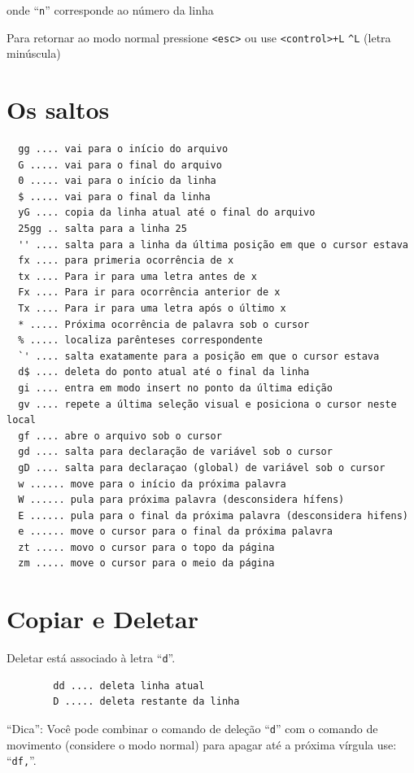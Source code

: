 \documentclass[10pt,a4paper,openany]{book}
\begin{document}
onde ``\verb|n|'' corresponde ao número da linha

Para retornar ao modo normal pressione \verb|<esc>| ou use \verb|<control>+L| \verb|^L| (letra
minúscula)

\section{Os saltos}\label{Os saltos}

\begin{verbatim}
  gg .... vai para o início do arquivo
  G ..... vai para o final do arquivo
  0 ..... vai para o início da linha
  $ ..... vai para o final da linha
  yG .... copia da linha atual até o final do arquivo
  25gg .. salta para a linha 25
  '' .... salta para a linha da última posição em que o cursor estava
  fx .... para primeria ocorrência de x
  tx .... Para ir para uma letra antes de x
  Fx .... Para ir para ocorrência anterior de x
  Tx .... Para ir para uma letra após o último x
  * ..... Próxima ocorrência de palavra sob o cursor
  % ..... localiza parênteses correspondente
  `' .... salta exatamente para a posição em que o cursor estava
  d$ .... deleta do ponto atual até o final da linha
  gi .... entra em modo insert no ponto da última edição
  gv .... repete a última seleção visual e posiciona o cursor neste local
  gf .... abre o arquivo sob o cursor
  gd .... salta para declaração de variável sob o cursor
  gD .... salta para declaraçao (global) de variável sob o cursor
  w ...... move para o início da próxima palavra
  W ...... pula para próxima palavra (desconsidera hífens)
  E ...... pula para o final da próxima palavra (desconsidera hifens)
  e ...... move o cursor para o final da próxima palavra
  zt ..... movo o cursor para o topo da página
  zm ..... move o cursor para o meio da página
\end{verbatim}

\section{Copiar e Deletar}\label{sec:Copiar e Deletar}

Deletar está associado à letra ``\verb|d|''.

\begin{verbatim}
		dd .... deleta linha atual
		D ..... deleta restante da linha
\end{verbatim}


``Dica'': Você pode combinar o comando de deleção ``\verb+d+'' com o
comando de movimento (considere o modo normal) para apagar até a
próxima vírgula use: ``\verb+df,+''. \\
\end{document}
